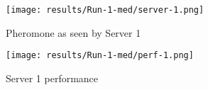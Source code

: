 \begin{figure}
	\centering
		\texttt{[image: results/Run-1-med/server-1.png]}
	\caption{Pheromone as seen by Server 1}
	\label{fig:1serv-pher-med}
\end{figure}

\begin{figure}
	\centering
		\texttt{[image: results/Run-1-med/perf-1.png]}
	\caption{Server 1 performance}
	\label{fig:1serv-perf-med}
\end{figure}